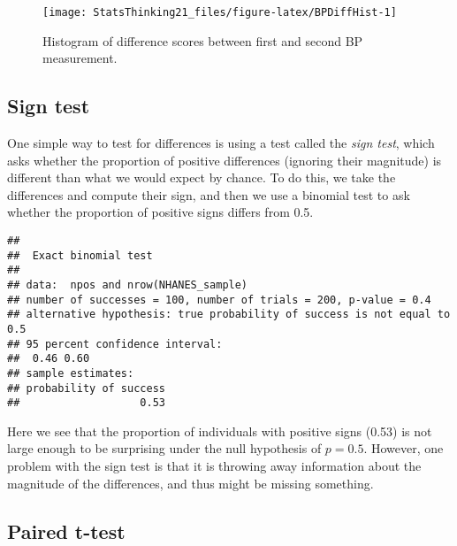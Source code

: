 \documentclass[]{book}
\newenvironment{Shaded}{\begin{snugshade}}{\end{snugshade}}
\newcommand{\KeywordTok}[1]{\textcolor[rgb]{0.13,0.29,0.53}{\textbf{#1}}}
\newcommand{\StringTok}[1]{\textcolor[rgb]{0.31,0.60,0.02}{#1}}
\newcommand{\CommentTok}[1]{\textcolor[rgb]{0.56,0.35,0.01}{\textit{#1}}}
\newcommand{\OperatorTok}[1]{\textcolor[rgb]{0.81,0.36,0.00}{\textbf{#1}}}
\newcommand{\NormalTok}[1]{#1}
\theoremstyle{definition}
\theoremstyle{definition}
\theoremstyle{definition}
\theoremstyle{remark}
\begin{document}
\begin{figure}
\texttt{[image: StatsThinking21\_files/figure-latex/BPDiffHist-1]} \caption{Histogram of difference scores between first and second BP measurement.}\label{fig:BPDiffHist}
\end{figure}

\subsection{Sign test}\label{sign-test}

One simple way to test for differences is using a test called the
\emph{sign test}, which asks whether the proportion of positive
differences (ignoring their magnitude) is different than what we would
expect by chance. To do this, we take the differences and compute their
sign, and then we use a binomial test to ask whether the proportion of
positive signs differs from 0.5.

\begin{Shaded}
\end{Shaded}

\begin{verbatim}
## 
##  Exact binomial test
## 
## data:  npos and nrow(NHANES_sample)
## number of successes = 100, number of trials = 200, p-value = 0.4
## alternative hypothesis: true probability of success is not equal to 0.5
## 95 percent confidence interval:
##  0.46 0.60
## sample estimates:
## probability of success 
##                   0.53
\end{verbatim}

Here we see that the proportion of individuals with positive signs
(0.53) is not large enough to be surprising under the null hypothesis of
\(p=0.5\). However, one problem with the sign test is that it is
throwing away information about the magnitude of the differences, and
thus might be missing something.

\subsection{Paired t-test}\label{paired-t-test}
\end{document}

